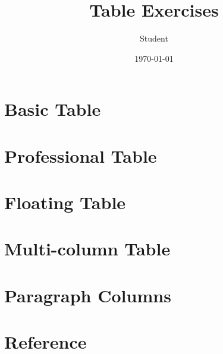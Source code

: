\documentclass[12pt,a4paper]{article}
\title{Table Exercises}
\author{Student}
\date{\today}
\begin{document}
\maketitle

\section{Basic Table}



\section{Professional Table}



\section{Floating Table}



\section{Multi-column Table}



\section{Paragraph Columns}



\section{Reference}

\end{document}
